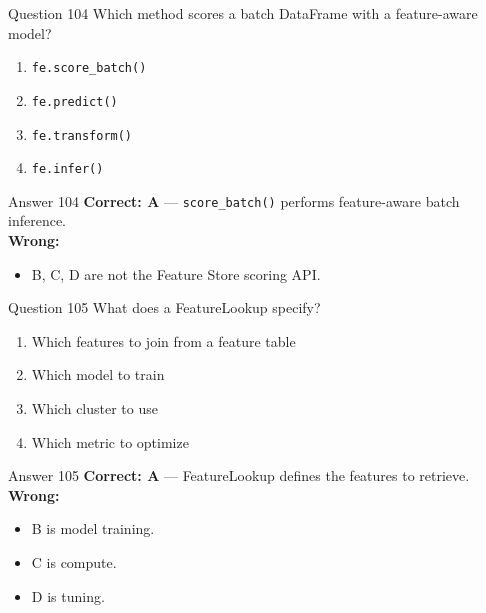 \documentclass[aspectratio=169,11pt]{beamer}
\begin{document}
	\begin{frame}{Question 104}
		Which method scores a batch DataFrame with a feature-aware model?
		\begin{enumerate}[label=\Alph*.]
			\item \texttt{fe.score\_batch()}
			\item \texttt{fe.predict()}
			\item \texttt{fe.transform()}
			\item \texttt{fe.infer()}
		\end{enumerate}
	\end{frame}
	\begin{frame}{Answer 104}
		\textbf{Correct: A} --- \texttt{score\_batch()} performs feature-aware batch inference.\\
		\vspace{0.5em}
		\textbf{Wrong:}
		\begin{itemize}
			\item B, C, D are not the Feature Store scoring API.
		\end{itemize}
	\end{frame}
	
	\begin{frame}{Question 105}
		What does a FeatureLookup specify?
		\begin{enumerate}[label=\Alph*.]
			\item Which features to join from a feature table
			\item Which model to train
			\item Which cluster to use
			\item Which metric to optimize
		\end{enumerate}
	\end{frame}
	\begin{frame}{Answer 105}
		\textbf{Correct: A} --- FeatureLookup defines the features to retrieve.\\
		\vspace{0.5em}
		\textbf{Wrong:}
		\begin{itemize}
			\item B is model training.
			\item C is compute.
			\item D is tuning.
		\end{itemize}
	\end{frame}
	
\end{document}
